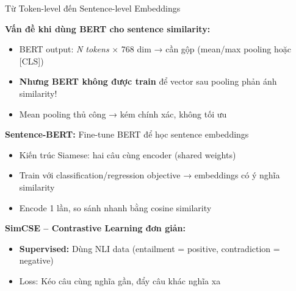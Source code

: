 \documentclass[aspectratio=169,xcolor=dvipsnames, t]{beamer}
\begin{document}
\begin{frame}{Từ Token-level đến Sentence-level Embeddings}
\justifying
\small

\textbf{Vấn đề khi dùng BERT cho sentence similarity:}
\begin{itemize}
    \item BERT output: \textit{N tokens} × 768 dim → cần gộp (mean/max pooling hoặc [CLS])
    \item \textbf{Nhưng BERT không được train} để vector sau pooling phản ánh similarity!
    \item Mean pooling thủ công → kém chính xác, không tối ưu
\end{itemize}

\vspace{0.3cm}
\textbf{Sentence-BERT:} Fine-tune BERT để học sentence embeddings
\begin{itemize}
    \item Kiến trúc Siamese: hai câu cùng encoder (shared weights)
    \item Train với classification/regression objective → embeddings có ý nghĩa similarity
    \item Encode 1 lần, so sánh nhanh bằng cosine similarity
\end{itemize}

\vspace{0.3cm}
\textbf{SimCSE – Contrastive Learning đơn giản:}
\begin{itemize}
    \item \textbf{Supervised:} Dùng NLI data (entailment = positive, contradiction = negative)
    \item Loss: Kéo câu cùng nghĩa gần, đẩy câu khác nghĩa xa
\end{itemize}

\end{frame}
\end{document}
